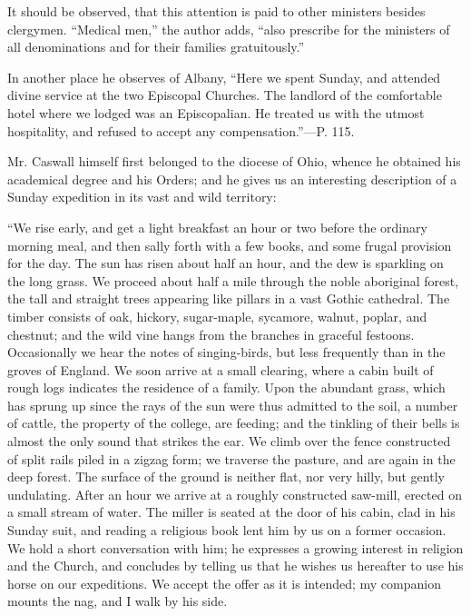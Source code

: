 It should be observed, that this attention is
paid to other ministers besides clergymen. ``Medical men,'' the author
adds, ``also prescribe for the ministers of all denominations and for
their families gratuitously.''

In another place he observes of Albany, ``Here we
spent Sunday, and attended divine service at the two Episcopal
Churches. The landlord of the comfortable hotel where we lodged was an
Episcopalian. He treated us with the utmost hospitality, and refused
to accept any compensation.''—P. 115.

Mr. Caswall himself first belonged to the diocese
of Ohio, whence he obtained his academical degree and his Orders; and
he gives us an interesting description of a Sunday expedition in its
vast and wild territory:

``We
rise early, and get a light breakfast an hour or two before the
ordinary morning meal, and then sally forth with a few books, and some
frugal provision for the day. The sun has risen about half an hour,
and the dew is sparkling on the long grass. We proceed about half a
mile through the noble aboriginal forest, the tall and straight trees
appearing like pillars in a vast Gothic cathedral. The
timber consists of oak, hickory, sugar-maple, sycamore, walnut,
poplar, and chestnut; and the wild vine hangs from the branches in
graceful festoons. Occasionally we hear the notes of singing-birds,
but less frequently than in the groves of England. We soon arrive at a
small clearing, where a cabin built of rough logs indicates the
residence of a family. Upon the abundant grass, which has sprung up
since the rays of the sun were thus admitted to the soil, a number of
cattle, the property of the college, are feeding; and the tinkling of
their bells is almost the only sound that strikes the ear. We climb
over the fence constructed of split rails piled in a zigzag form; we
traverse the pasture, and are again in the deep forest. The surface of
the ground is neither flat, nor very hilly, but gently undulating.
After an hour we arrive at a roughly constructed saw-mill, erected on
a small stream of water. The miller is seated at the door of his
cabin, clad in his Sunday suit, and reading a religious book lent him
by us on a former occasion. We hold a short conversation with him; he
expresses a growing interest in religion and the Church, and concludes
by telling us that he wishes us hereafter to use his horse on our
expeditions. We accept the offer as it is intended; my companion
mounts the nag, and I walk by his side.

